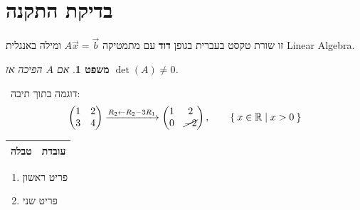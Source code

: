 \documentclass[12pt, a4paper]{article}
\newtheorem{theorem}{משפט}
\begin{document}
\section{בדיקת התקנה}

זו שורת טקסט בעברית בגופן \textbf{דוד} עם מתמטיקה $A\vec{x}=\vec{b}$ ומילה באנגלית
\textenglish{Linear Algebra}.

\begin{theorem}
אם $A$ הפיכה אז $\det(A)\neq 0$.
\end{theorem}

\begin{example}
\faLightbulb\ דוגמה בתוך תיבה:
\[
\begin{pmatrix} 1 & 2 \\ 3 & 4 \end{pmatrix}
\xrightarrow{R_2 \leftarrow R_2 - 3R_1}
\begin{pmatrix} 1 & 2 \\ 0 & \cancel{-2} \end{pmatrix},
\qquad \Set{x \in \mathbb{R} | x > 0}
\]
\end{example}

\begin{tabular}{|c|c|}
\hline
טבלה & עובדת \\
\hline
\end{tabular}
\quad {} 

\begin{enumerate}[label=\alph*.]
\item פריט ראשון
\item פריט שני
\end{enumerate}

\end{document}
